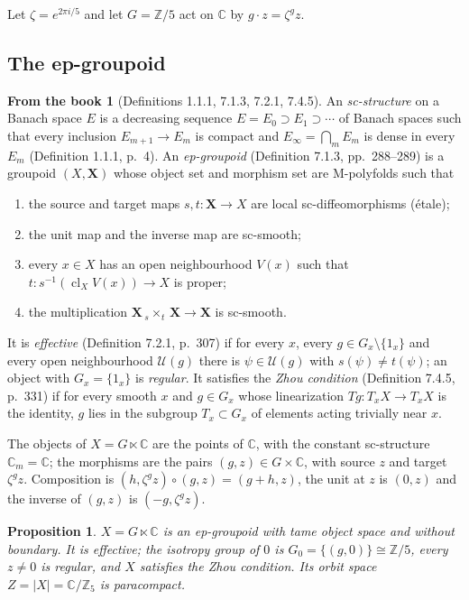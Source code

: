 \documentclass[11pt,a4paper]{article}
\theoremstyle{plain}
\newtheorem{proposition}[theorem]{Proposition}
\theoremstyle{definition}
\newtheorem{recall}[theorem]{From the book}
\theoremstyle{remark}
\newcommand{\C}{\mathbb{C}}
\newcommand{\Z}{\mathbb{Z}}
\newcommand{\ZZ}{\Z/5}
\newcommand{\abs}[1]{\lvert #1\rvert}
\newcommand{\cl}{\operatorname{cl}}
\begin{document}
Let $\zeta=e^{2\pi i/5}$ and let $G=\ZZ$ act on $\C$ by $g\cdot z=\zeta^g z$.

\subsection{The ep-groupoid}

\begin{recall}[Definitions 1.1.1, 7.1.3, 7.2.1, 7.4.5]\label{rec:epgroupoid}
An \emph{sc-structure} on a Banach space $E$ is a decreasing sequence $E=E_0\supset E_1\supset\cdots$
of Banach spaces such that every inclusion $E_{m+1}\to E_m$ is compact and $E_\infty=\bigcap_m E_m$ is
dense in every $E_m$ (Definition 1.1.1, p.~4). An \emph{ep-groupoid} (Definition 7.1.3, pp.~288--289)
is a groupoid $(X,\mathbf X)$ whose object set and morphism set are M-polyfolds such that
\begin{enumerate}[label=(\arabic*)]
\item the source and target maps $s,t\colon\mathbf X\to X$ are local sc-diffeomorphisms (étale);
\item the unit map and the inverse map are sc-smooth;
\item every $x\in X$ has an open neighbourhood $V(x)$ such that $t\colon s^{-1}(\cl_X V(x))\to X$ is
  proper;
\item the multiplication $\mathbf X\,{}_s{\times}_t\,\mathbf X\to\mathbf X$ is sc-smooth.
\end{enumerate}
It is \emph{effective} (Definition 7.2.1, p.~307) if for every $x$, every $g\in G_x\setminus\{1_x\}$ and
every open neighbourhood $\mathcal U(g)$ there is $\psi\in\mathcal U(g)$ with $s(\psi)\neq t(\psi)$; an
object with $G_x=\{1_x\}$ is \emph{regular}. It satisfies the \emph{Zhou condition} (Definition 7.4.5,
p.~331) if for every smooth $x$ and $g\in G_x$ whose linearization $Tg\colon T_xX\to T_xX$ is the
identity, $g$ lies in the subgroup $T_x\subset G_x$ of elements acting trivially near $x$.
\end{recall}

The objects of $X=G\ltimes\C$ are the points of $\C$, with the constant sc-structure $\C_m=\C$; the
morphisms are the pairs $(g,z)\in G\times\C$, with source $z$ and target $\zeta^g z$. Composition is
$(h,\zeta^g z)\circ(g,z)=(g+h,z)$, the unit at $z$ is $(0,z)$ and the inverse of $(g,z)$ is
$(-g,\zeta^g z)$.

\begin{proposition}\label{prop:epgroupoid}
$X=G\ltimes\C$ is an ep-groupoid with tame object space and without boundary. It is effective; the
isotropy group of $0$ is $G_0=\{(g,0)\}\cong\ZZ$, every $z\neq0$ is regular, and $X$ satisfies the Zhou
condition. Its orbit space $Z=\abs X=\C/\Z_5$ is paracompact.
\end{proposition}
\end{document}
